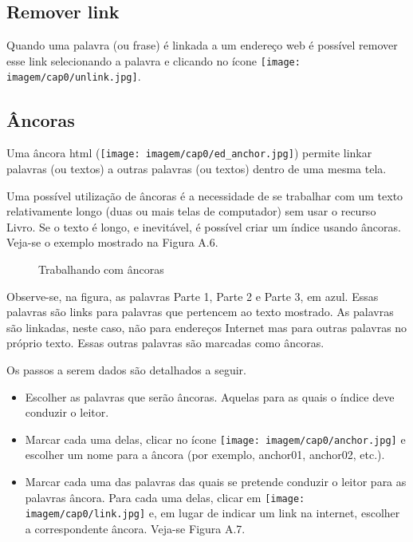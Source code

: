 \subsection{Remover link}


Quando uma palavra (ou frase) é linkada a um endereço web é possível remover esse link selecionando a palavra e clicando no ícone \texttt{[image: imagem/cap0/unlink.jpg]}.

\subsection{Âncoras}


Uma âncora html (\texttt{[image: imagem/cap0/ed\_anchor.jpg]}) permite linkar palavras (ou textos) a outras palavras (ou textos) dentro de uma mesma tela.

Uma possível utilização de âncoras é a necessidade de se trabalhar com um texto relativamente longo (duas ou mais telas de computador) sem usar o recurso Livro. Se o texto é longo, e inevitável, é possível criar um índice usando âncoras. Veja-se o exemplo mostrado na Figura A.6.

\begin{figure}
 \begin{center}
  \caption{Trabalhando com âncoras}
 \end{center}
\end{figure}

Observe-se, na figura, as palavras Parte 1, Parte 2 e Parte 3, em azul. Essas palavras são links para palavras que pertencem ao texto mostrado. As palavras são linkadas, neste caso, não para endereços Internet mas para outras palavras no próprio texto. Essas outras palavras são marcadas como âncoras.

Os passos a serem dados são detalhados a seguir.

\begin{itemize}
 \item Escolher as palavras que serão âncoras. Aquelas para as quais o índice deve conduzir o leitor.
 \item Marcar cada uma delas, clicar no ícone \texttt{[image: imagem/cap0/anchor.jpg]} e escolher um nome para a âncora (por exemplo, anchor01, anchor02, etc.).
 \item Marcar cada uma das palavras das quais se pretende conduzir o leitor para as palavras âncora. Para cada uma delas, clicar em \texttt{[image: imagem/cap0/link.jpg]} e, em lugar de indicar um link na internet, escolher a correspondente âncora. Veja-se Figura A.7.
\end{itemize}

